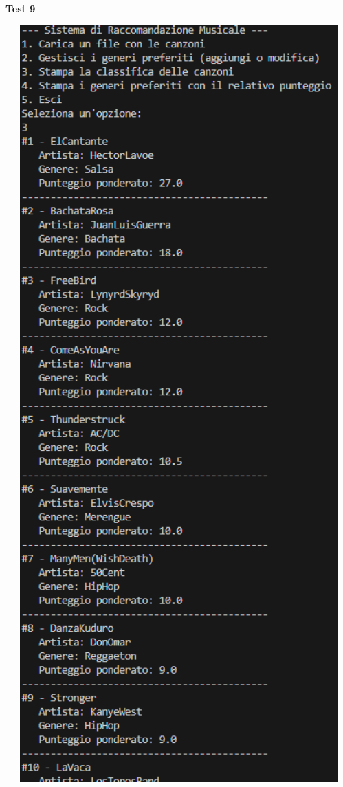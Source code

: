 \documentclass[a4paper,11pt]{article}
\begin{document}
    \newpage
    \begin{center}
        \textbf{Test 9}
        \par
        \vspace{0.5cm}
        \includegraphics[width=1\textwidth]{Immagini/Tests/htest9}
    \end{center}
\end{document}
